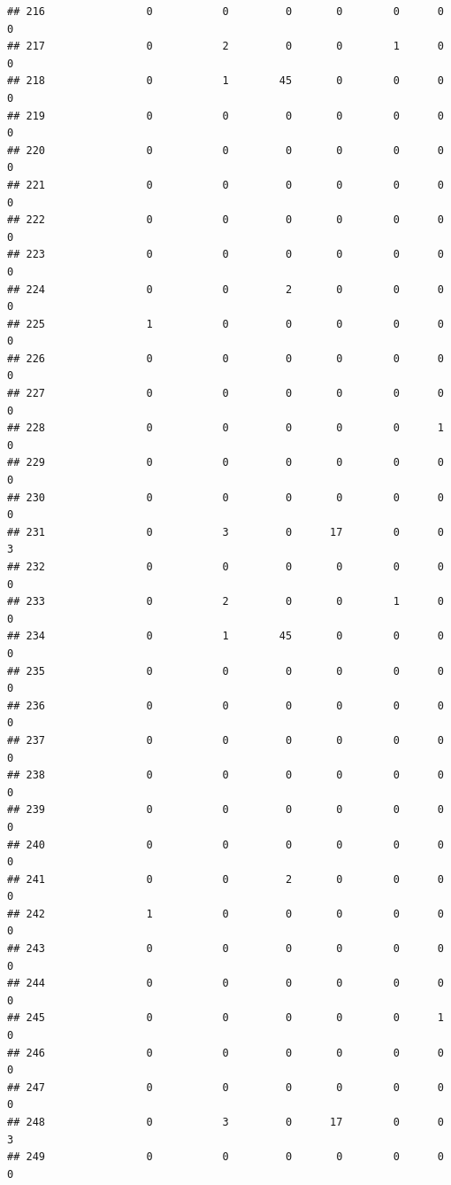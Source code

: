 \documentclass[
]{article}
\begin{document}
\begin{verbatim}
## 216                0           0         0       0        0      0      0
## 217                0           2         0       0        1      0      0
## 218                0           1        45       0        0      0      0
## 219                0           0         0       0        0      0      0
## 220                0           0         0       0        0      0      0
## 221                0           0         0       0        0      0      0
## 222                0           0         0       0        0      0      0
## 223                0           0         0       0        0      0      0
## 224                0           0         2       0        0      0      0
## 225                1           0         0       0        0      0      0
## 226                0           0         0       0        0      0      0
## 227                0           0         0       0        0      0      0
## 228                0           0         0       0        0      1      0
## 229                0           0         0       0        0      0      0
## 230                0           0         0       0        0      0      0
## 231                0           3         0      17        0      0      3
## 232                0           0         0       0        0      0      0
## 233                0           2         0       0        1      0      0
## 234                0           1        45       0        0      0      0
## 235                0           0         0       0        0      0      0
## 236                0           0         0       0        0      0      0
## 237                0           0         0       0        0      0      0
## 238                0           0         0       0        0      0      0
## 239                0           0         0       0        0      0      0
## 240                0           0         0       0        0      0      0
## 241                0           0         2       0        0      0      0
## 242                1           0         0       0        0      0      0
## 243                0           0         0       0        0      0      0
## 244                0           0         0       0        0      0      0
## 245                0           0         0       0        0      1      0
## 246                0           0         0       0        0      0      0
## 247                0           0         0       0        0      0      0
## 248                0           3         0      17        0      0      3
## 249                0           0         0       0        0      0      0

\end{verbatim}
\end{document}
